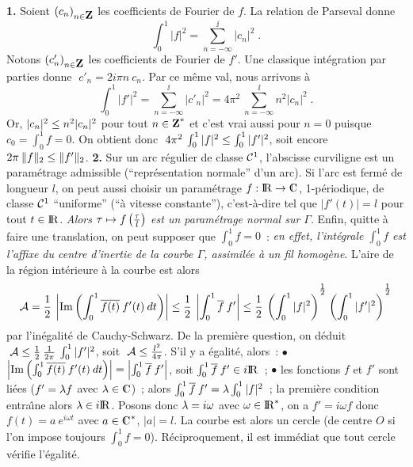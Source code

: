 \documentclass{article}
\begin{document}
{\bf 1.} Soient $(c_n)_{n\in\zmat}$ les coefficients de Fourier de $f$. La relation de Parseval donne\vv $$\int_0^1|f|^2=\sum_{n=-\infty}^{\ii}|c_n|^2\;.$$\sect
Notons $(c'_n)_{n\in\zmat}$ les coefficients de Fourier de $f'$. Une classique int\'egration par parties donne $\;c'_n=2i\pi n\>c_n$. Par ce m\^eme val, nous arrivons \`a\vv
$$\int_0^1|f'|^2=\sum_{n=-\infty}^{\ii}|c'_n|^2=4\pi^2\>\sum_{n=-\infty}^{\ii}n^2|c_n|^2\;.$$
Or, $|c_n|^2\leq n^2|c_n|^2$ pour tout $n\in\zmat^*$ et c'est vrai aussi pour $n=0$ puisque $c_0=\int_0^1f=0$. On obtient donc $\;4\pi^2\>\int_0^1|f|^2\leq\int_0^1|f'|^2$, soit encore $2\pi\>\|f\|_2\leq\|f'\|_2$.
\msk
{\bf 2.} Sur un arc r\'egulier de classe ${\cal C}^1$, l'abscisse curviligne est un param\'etrage admissible (``repr\'esentation normale'' d'un arc). Si l'arc est ferm\'e de longueur $l$, on peut aussi choisir un param\'etrage $f:\rmat\vers\cmat$, 1-p\'eriodique, de classe ${\cal C}^1$ ``uniforme'' (``\`a vitesse constante''), c'est-\`a-dire tel que $|f'(t)|=l$ pour tout $t\in{\rm I\kern-0.6mm R}$. {\it Alors $\tau\mapsto f\left({\tau\over l}\right)$ est un param\'etrage normal sur $\Gamma$}. Enfin, quitte \`a faire une translation, on peut supposer que $\int_0^1f=0$~: {\it en effet, l'int\'egrale $\int_0^1f$ est l'affixe du centre d'inertie de la courbe $\Gamma$, assimil\'ee \`a un fil homog\`ene}.\msk\sect
L'aire de la r\'egion int\'erieure \`a la courbe est alors\vv
$${\cal A}={1\s 2}\>\left|\Im\lp\int_0^1\ov{f(t)}\>f'(t)\>dt\rp\right|\ie{1\s2}\>\left|\int_0^1\ov{f}\>f'\right|\ie{1\s2}\>\lp\int_0^1|f|^2\rp^{{}^{\sst1\sur\sst2}}\lp\int_0^1|f'|^2\rp^{{}^{\sst1\sur\sst2}}$$
par l'in\'egalit\'e de Cauchy-Schwarz. De la premi\`ere question, on d\'eduit $\;{\cal A}\leq{1\over2}\>{1\over2\pi}\>\int_0^1|f'|^2$, soit $\;{\cal A}\leq{l^2\over4\pi}$.
\msk\sect
S'il y a \'egalit\'e, alors~:\ssk\new
$\bullet$ $\left|\mathop{\rm Im}\nolimits\left(\int_0^1\overline{f(t)}\>f'(t)\>dt\right)\right|=\left|\int_0^1\overline{f}\>f'\right|$, soit $\int_0^1\overline{f}\>f'\in i{\rm I\kern-0.6mm R}$~;\ssk\new
$\bullet$ les fonctions $f$ et $f'$ sont li\'ees ($f'=\lambda f$ avec $\lam\in\cmat$)~; alors $\int_0^1\overline{f}\>f'=\lambda\int_0^1|f|^2$~; la premi\`ere condition entra\^\i ne alors $\lambda\in i{\rm I\kern-0.6mm R}$.\ssk\new
Posons donc $\lambda=i\omega$ avec $\omega\in{\rm I\kern-0.6mm R}^*$, on a $f'=i\omega f$ donc $f(t)=a\>e^{i\omega t}$ avec $a\in\cet$, $|a|=l$. La courbe est alors un cercle (de centre $O$ si l'on impose toujours $\int_0^1f=0$).
\msk\sect
R\'eciproquement, il est imm\'ediat que tout cercle v\'erifie l'\'egalit\'e.
\end{document}
